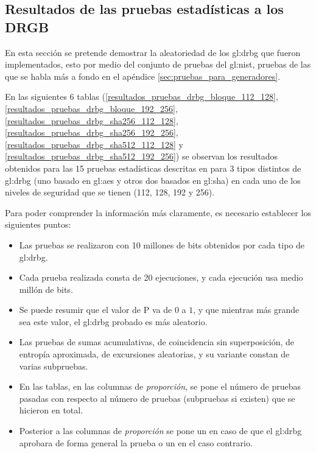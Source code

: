 %
%

\subsection{Resultados de las pruebas estadísticas a los DRGB}
\label{sec:resultados_pruebas_estadisticas_drgb}

En esta sección se pretende demostrar la aleatoriedad de los \gls{gl:drbg}
que fueron implementados, esto por medio del conjunto de pruebas del
\gls{gl:nist}, pruebas de las que se habla más a fondo en el apéndice
\ref{sec:pruebas_para_generadores}.

En las siguientes 6 tablas
(\ref{resultados_pruebas_drbg_bloque_112_128},
\ref{resultados_pruebas_drbg_bloque_192_256},
\ref{resultados_pruebas_drbg_sha256_112_128},
\ref{resultados_pruebas_drbg_sha256_192_256},
\ref{resultados_pruebas_drbg_sha512_112_128} y
\ref{resultados_pruebas_drbg_sha512_192_256})
se observan los resultados obtenidos para las 15 pruebas estadísticas
descritas en \cite{nist_pruebas} para 3 tipos distintos de \gls{gl:drbg}
(uno basado en \gls{gl:aes} y otros dos basados en \gls{gl:sha}) en cada
uno de los niveles de seguridad que se tienen (112, 128, 192 y 256).

Para poder comprender la información más claramente, es necesario establecer
los siguientes puntos:

\begin{itemize}

  \item Las pruebas se realizaron con 10 millones de bits obtenidos por cada
    tipo de \gls{gl:drbg}.

  \item Cada prueba realizada consta de 20 ejecuciones, y cada ejecución usa
    medio millón de bits.

  \item Se puede resumir que el valor de P va de $0$ a $1$, y que mientras
    más grande sea este valor, el \gls{gl:drbg} probado es más aleatorio.

  \item Las pruebas de sumas acumulativas, de coincidencia sin superposición,
    de entropía aproximada, de excursiones aleatorias, y su variante constan
    de varias subpruebas.

  \item En las tablas, en las columnas de \textit{proporción}, se pone el
    número de pruebas pasadas con respecto al número de pruebas (subpruebas
    si existen) que se hicieron en total.

  \item Posterior a las columnas de \textit{proporción} se pone un 
    en caso de que el \gls{gl:drbg} aprobara de forma general la prueba o un
     en el caso contrario.

\end{itemize}

